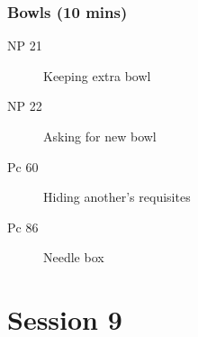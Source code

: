 \documentclass[11pt,oneside]{memoir}
\begin{document}
\begin{multicols}{2}
\subsection{Bowls (10 mins)}

\begin{description}
\item[NP 21] Keeping extra bowl
\item[NP 22] Asking for new bowl
\item[Pc 60] Hiding another's requisites
\item[Pc 86] Needle box
\end{description}

\end{multicols}

\chapter{Session 9}
\end{document}
